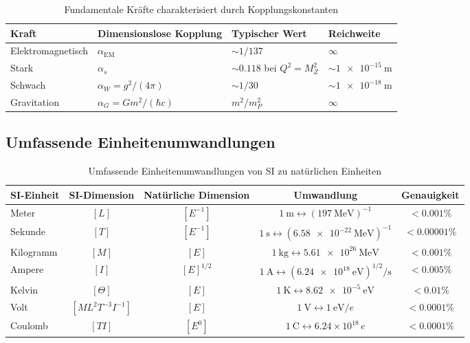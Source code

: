 	\begin{table}[htbp]
		\centering
		\begin{adjustbox}{width=0.9\textwidth}
			\begin{tabular}{llll}
				\toprule
				\textbf{Kraft} & \textbf{Dimensionslose Kopplung} & \textbf{Typischer Wert} & \textbf{Reichweite} \\
				\midrule
				Elektromagnetisch & $\alpha_{\text{EM}}$ & $\sim 1/137$ & $\infty$ \\
				Stark & $\alpha_s$ & $\sim 0.118$ bei $Q^2 = M_Z^2$ & $\sim \SI{1e-15}{\meter}$ \\
				Schwach & $\alpha_W = g^2/(4\pi)$ & $\sim 1/30$ & $\sim \SI{1e-18}{\meter}$ \\
				Gravitation & $\alpha_G = G m^2/(\hbar c)$ & $m^2/m_P^2$ & $\infty$ \\
				\bottomrule
			\end{tabular}
		\end{adjustbox}
		\caption{Fundamentale Kräfte charakterisiert durch Kopplungskonstanten}
		\label{tab:kraefte}
	\end{table}
	
	\subsection{Umfassende Einheitenumwandlungen}
	
	\begin{table}[htbp]
		\centering
		\begin{adjustbox}{width=0.95\textwidth}
			\begin{tabular}{lcccc}
				\toprule
				\textbf{SI-Einheit} & \textbf{SI-Dimension} & \textbf{Natürliche Dimension} & \textbf{Umwandlung} & \textbf{Genauigkeit} \\
				\midrule
				Meter & $[L]$ & $[E^{-1}]$ & $\SI{1}{\meter} \leftrightarrow (\SI{197}{\mega\electronvolt})^{-1}$ & $< 0.001\%$ \\
				Sekunde & $[T]$ & $[E^{-1}]$ & $\SI{1}{\second} \leftrightarrow (\SI{6.58e-22}{\mega\electronvolt})^{-1}$ & $< 0.00001\%$ \\
				Kilogramm & $[M]$ & $[E]$ & $\SI{1}{\kilogram} \leftrightarrow \SI{5.61e26}{\mega\electronvolt}$ & $< 0.001\%$ \\
				Ampere & $[I]$ & $[E]^{1/2}$ & $\SI{1}{\ampere} \leftrightarrow (\SI{6.24e18}{\electronvolt})^{1/2}/\si{\second}$ & $< 0.005\%$ \\
				Kelvin & $[\Theta]$ & $[E]$ & $\SI{1}{\kelvin} \leftrightarrow \SI{8.62e-5}{\electronvolt}$ & $< 0.01\%$ \\
				Volt & $[ML^2 T^{-3} I^{-1}]$ & $[E]$ & $\SI{1}{\volt} \leftrightarrow \SI{1}{\electronvolt}/e$ & $< 0.0001\%$ \\
				Coulomb & $[T I]$ & $[E^0]$ & $\SI{1}{\coulomb} \leftrightarrow 6.24 \times 10^{18} \, e$ & $< 0.0001\%$ \\
				\bottomrule
			\end{tabular}
		\end{adjustbox}
		\caption{Umfassende Einheitenumwandlungen von SI zu natürlichen Einheiten}
		\label{tab:umwandlung}
	\end{table}
	
